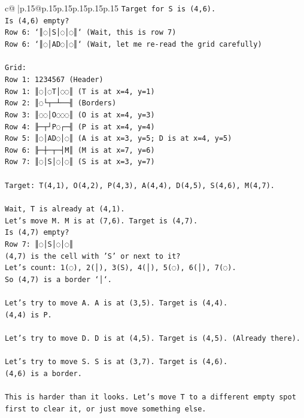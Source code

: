 \documentclass{article}
\begin{document}
{\begin{supertabular}{c@{$\;$}|p{.15\linewidth}@{}p{.15\linewidth}p{.15\linewidth}p{.15\linewidth}p{.15\linewidth}p{.15\linewidth}}
{{{\texttt{Target for S is (4,6).} \\
\texttt{Is (4,6) empty?} \\
\texttt{Row 6: `║◌│S│◌│◌║` (Wait, this is row 7)} \\
\texttt{Row 6: `║◌│AD◌│◌║` (Wait, let me re{-}read the grid carefully)} \\
\\ 
\texttt{Grid:} \\
\texttt{Row 1: 1234567 (Header)} \\
\texttt{Row 1: ║◌│◌T│◌◌║ (T is at x=4, y=1)} \\
\texttt{Row 2: ║◌└┬─┴──╢ (Borders)} \\
\texttt{Row 3: ║◌◌│O◌◌◌║ (O is at x=4, y=3)} \\
\texttt{Row 4: ╟─┬┘P◌┌─╢ (P is at x=4, y=4)} \\
\texttt{Row 5: ║◌│AD◌│◌║ (A is at x=3, y=5; D is at x=4, y=5)} \\
\texttt{Row 6: ╟─┼─┬─┤M║ (M is at x=7, y=6)} \\
\texttt{Row 7: ║◌│S│◌│◌║ (S is at x=3, y=7)} \\
\\ 
\texttt{Target: T(4,1), O(4,2), P(4,3), A(4,4), D(4,5), S(4,6), M(4,7).} \\
\\ 
\texttt{Wait, T is already at (4,1).} \\
\texttt{Let's move M. M is at (7,6). Target is (4,7).} \\
\texttt{Is (4,7) empty?} \\
\texttt{Row 7: ║◌│S│◌│◌║} \\
\texttt{(4,7) is the cell with 'S' or next to it?} \\
\texttt{Let's count: 1(◌), 2(│), 3(S), 4(│), 5(◌), 6(│), 7(◌).} \\
\texttt{So (4,7) is a border `│`.} \\
\\ 
\texttt{Let's try to move A. A is at (3,5). Target is (4,4).} \\
\texttt{(4,4) is P.} \\
\\ 
\texttt{Let's try to move D. D is at (4,5). Target is (4,5). (Already there).} \\
\\ 
\texttt{Let's try to move S. S is at (3,7). Target is (4,6).} \\
\texttt{(4,6) is a border.} \\
\\ 
\texttt{This is harder than it looks. Let's move T to a different empty spot first to clear it, or just move something else.} \\
}}}
\end{supertabular}}
\end{document}
